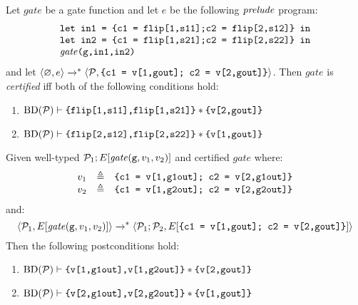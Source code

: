 \begin{definition}
  \label{definition-gmwgate-certification}
  Let $\mathit{gate}$ be a gate function and let $e$ be the following
  $\mathit{prelude}$ program:
  $$
  \begin{array}{l}
    \texttt{let in1 = \{c1 = flip[1,s11];c2 = flip[2,s12]\} in}\\
    \texttt{let in2 = \{c1 = flip[1,s21];c2 = flip[2,s22]\} in}\\
    \mathit{gate}\texttt{(g,in1,in2)}
  \end{array}
  $$
  and let $
  \langle \varnothing,e \rangle\xrightarrow{}^{*}\langle \mathcal{P},\texttt{\{c1 = v[1,gout]; c2 = v[2,gout]\}} \rangle
  $.
  Then $\mathit{gate}$ is \emph{certified} iff both of the following conditions hold:
  \begin{enumerate}
  \item $\mathrm{BD}(\mathcal{P}) \vdash \texttt{\{flip[1,s11],flip[1,s21]\}} * \texttt{\{v[2,gout]\}}$
  \item $\mathrm{BD}(\mathcal{P}) \vdash \texttt{\{flip[2,s12],flip[2,s22]\}} * \texttt{\{v[1,gout]\}}$
  \end{enumerate}
\end{definition}

\begin{lemma}
  \label{lemma-compose-gmw}
  Given well-typed $\mathcal{P}_1;E[\mathit{gate}(\texttt{g},v_1,v_2)]$ and certified $\mathit{gate}$ where:
  $$
  \begin{array}{lcr}
   v_1 &\triangleq& \texttt{\{c1 = v[1,g1out]; c2 = v[2,g1out]\}}\\
   v_2 &\triangleq& \texttt{\{c1 = v[1,g2out]; c2 = v[2,g2out]\}}
  \end{array}
  $$
  and:
  $$
  \langle \mathcal{P}_1,E[\mathit{gate}(\texttt{g},v_1,v_2)] \rangle \xrightarrow{}^{*} \langle \mathcal{P}_1;\mathcal{P}_2,E[\texttt{\{c1 = v[1,gout]; c2 = v[2,gout]\}}] \rangle
  $$
  Then the following postconditions hold:
  \begin{enumerate}
  \item $\mathrm{BD}(\mathcal{P}) \vdash \texttt{\{v[1,g1out],v[1,g2out]\}} * \texttt{\{v[2,gout]\}}$
  \item $\mathrm{BD}(\mathcal{P}) \vdash \texttt{\{v[2,g1out],v[2,g2out]\}} * \texttt{\{v[1,gout]\}}$
  \end{enumerate}
\end{lemma}

